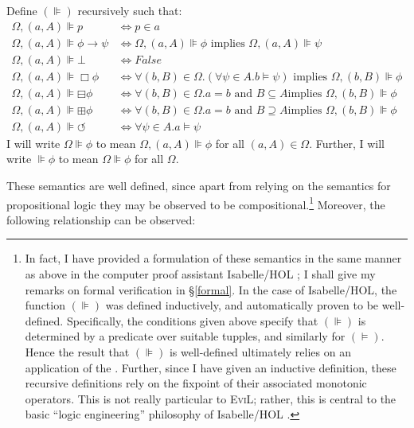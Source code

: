 \begin{definition}
 Define $(\VDash)$ recursively such that:
\begin{align*}
  {\Omega},(a,A){\VDash} p & {\iff}p{\in}a\\
  {\Omega},(a,A){\VDash} {\phi}{\rightarrow}{\psi} &
  {\iff}{\Omega},(a,A){\VDash}{\phi}\text{ implies
  }{\Omega},(a,A){\VDash}{\psi}\\
  {\Omega},(a,A){\VDash}{\bot} & {\iff} False\\
  {\Omega},(a,A){\VDash}\Box {\phi} & {\iff}{\forall}(b,B){\in}{\Omega}.
  ({\forall}{\psi}{\in}A. b{\models}{\psi})\text{ implies
  }{\Omega},(b,B){\VDash}{\phi}\\
  {\Omega},(a,A){\VDash}{\boxminus}{\phi} &
  {\iff}{\forall}(b,B){\in}{\Omega}. a=b\text{ and }B{\subseteq}A\text{
  implies }{\Omega},(b,B){\VDash}{\phi}\\
  {\Omega},(a,A){\VDash}{\boxplus}{\phi} &
  {\iff}{\forall}(b,B){\in}{\Omega}. a=b\text{ and }B{\supseteq}A\text{
  implies }{\Omega},(b,B){\VDash}{\phi}\\
  {\Omega},(a,A){\VDash}{\circlearrowleft} & {\iff}
  {\forall}{\psi}{\in}A.a{\models}{\psi}
\end{align*}
I will write $\Omega \VDash \phi$ to mean $\Omega, (a,A) \VDash \phi$ for all $(a,A) \in \Omega$.  Further, I will write $\VDash \phi$ to mean $\Omega \VDash \phi$ for all $\Omega$.
\end{definition}
These semantics are well defined, since apart from relying on the semantics
for propositional logic they may be observed to be compositional.{\footnote{In
fact, I have provided a formulation of these semantics in the same manner as
above in the computer proof assistant Isabelle/HOL \citep{nipkow_isabelle/hol:proof_2002}; I shall
give my remarks on formal verification in \S\ref{formal}.  In the case of
Isabelle/HOL, the function $(\VDash)$ was defined inductively, and
automatically proven to be well-defined.  Specifically, the conditions given
above specify that $(\VDash)$ is determined by a 
predicate over suitable tupples, and similarly for $(\models)$.  Hence the
result that $(\VDash)$ is well-defined ultimately relies on an application of
the  \citep[chapter 12]{roman_lattices_2008}. Further,
since I have given an inductive definition, these recursive definitions rely
on the {} fixpoint of their associated monotonic
operators.  This is not really particular to \textsc{EviL}; rather, this is
central to the basic ``logic engineering'' philosophy of Isabelle/HOL \citep{berghofer_meta-theory_2009}.}} 
Moreover, the following relationship can be observed:

